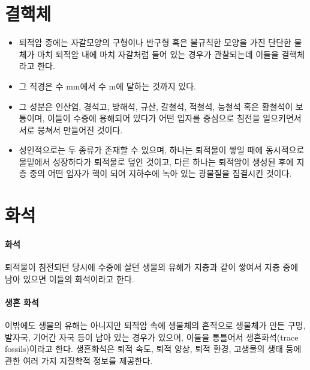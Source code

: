\documentclass[12pt, a4paper, twoside]{book}
\begin{document}
	\clearpage
	\section{결핵체}

			\begin{itemize}[	topsep=0.0em, itemsep=0.0em, leftmargin=4em, labelsep=3em ] 
			\item	퇴적암 중에는 자갈모양의 구형이나 반구형 혹은 불규칙한 모양을 가진 단단한 물체가 
					마치 퇴적암 내에 마치 자갈처럼 들어 있는 경우가 관찰되는데 이들을 결핵체라고 한다.
			\item	그 직경은 수 mm에서 수 m에 달하는 것까지 있다.
			\item	그 성분은 인산염, 경석고, 방해석, 규산, 갈철석, 적철석, 능철석 혹은 황철석이 보통이며, 
					이들이 수중에 용해되어 있다가 어떤 입자를 중심으로 침전을 일으키면서 서로 뭉쳐서 만들어진 것이다.
			\item	성인적으로는 두 종류가 존재할 수 있으며, 
					하나는 퇴적물이 쌓일 때에 동시적으로 물밑에서 성장하다가 퇴적물로 덮인 것이고, 
					다른 하나는 퇴적암이 생성된 후에 지층 중의 어떤 입자가 핵이 되어 지하수에 녹아 있는 광물질을 집결시킨 것이다.
			\end{itemize}	








	\clearpage
	\section{화석}


		\paragraph{화석}
		퇴적물이 침전되던 당시에 수중에 살던 생물의 유해가 지층과 같이 쌓여서 지층 중에 남아 있으면 이들의 화석이라고 한다.

		\paragraph{생흔 화석}
		이밖에도 생물의 유해는 아니지만 퇴적암 속에 생물체의 흔적으로 생물체가 만든 구멍, 발자국, 기어간 자국 등이 남아 있는 경우가 있으며, 
		이들을 통틀어서 생흔화석(trace fossils)이라고 한다.
		생흔화석은 퇴적 속도, 퇴적 양상, 퇴적 환경, 고생물의 생태 등에 관한 여러 가지 지질학적 정보를 제공한다.
\end{document}
